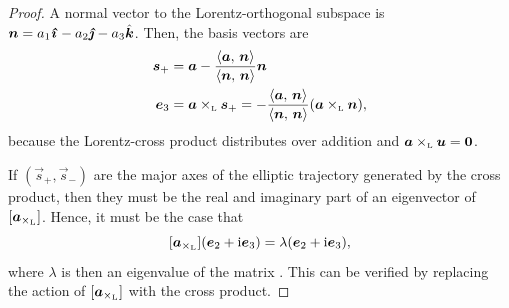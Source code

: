 \begin{proof}
    A normal vector to the Lorentz-orthogonal subspace is 
    $\vec{n} = a_1\quati - a_2\quatj - a_3\quatk$. 
    Then, the basis vectors are
    \begin{equation}
        \begin{split}
            \vec{s}_+ &= \vec{a} - \frac{ \inner{\vec{a}}{\vec{n}} }{ \inner{\vec{n}}{\vec{n}} } \vec{n} \\
            \vec{e}_3 &= \lorcrossp{\vec{a}}{\vec{s}_+} = -\frac{ \inner{\vec{a}}{\vec{n}} }{ \inner{\vec{n}}{\vec{n}} } \qty(\lorcrossp{\vec{a}}{\vec{n}}),
        \end{split}
    \end{equation}
    because the Lorentz-cross product distributes over addition and $\lorcrossp{\vec{a}}{\vec{u}} = \mathbf{0}$. 

    If $(\vec{s}_+, \vec{s}_-)$ are the major axes of the elliptic trajectory generated by the cross product, then they must be the real and imaginary part of an eigenvector of $[\vec{a}_{\lorcrossp{}{}}]$. Hence, it must be the case that 
    $$[\vec{a}_{\lorcrossp{}{}}](\vec{e}_2 + \ii\vec{e}_3) = \lambda(\vec{e}_2 + \ii\vec{e}_3),$$ 
    where $\lambda$ is then an eigenvalue of the matrix \cite{Edwards2018}. This can be verified by replacing the action of $[\vec{a}_{\lorcrossp{}{}}]$ with the cross product. 
    

\end{proof}
